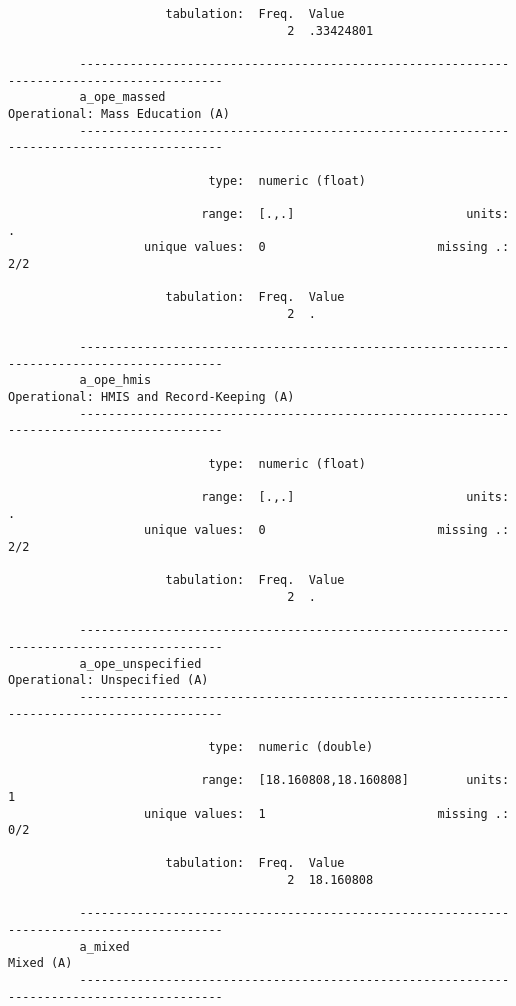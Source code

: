 \documentclass{article}
\begin{document}
\begin{verbatim}
                      tabulation:  Freq.  Value
                                       2  .33424801
          
          ------------------------------------------------------------------------------------------
          a_ope_massed                                               Operational: Mass Education (A)
          ------------------------------------------------------------------------------------------
          
                            type:  numeric (float)
          
                           range:  [.,.]                        units:  .
                   unique values:  0                        missing .:  2/2
          
                      tabulation:  Freq.  Value
                                       2  .
          
          ------------------------------------------------------------------------------------------
          a_ope_hmis                                        Operational: HMIS and Record-Keeping (A)
          ------------------------------------------------------------------------------------------
          
                            type:  numeric (float)
          
                           range:  [.,.]                        units:  .
                   unique values:  0                        missing .:  2/2
          
                      tabulation:  Freq.  Value
                                       2  .
          
          ------------------------------------------------------------------------------------------
          a_ope_unspecified                                             Operational: Unspecified (A)
          ------------------------------------------------------------------------------------------
          
                            type:  numeric (double)
          
                           range:  [18.160808,18.160808]        units:  1
                   unique values:  1                        missing .:  0/2
          
                      tabulation:  Freq.  Value
                                       2  18.160808
          
          ------------------------------------------------------------------------------------------
          a_mixed                                                                          Mixed (A)
          ------------------------------------------------------------------------------------------
          

\end{verbatim}
\end{document}
